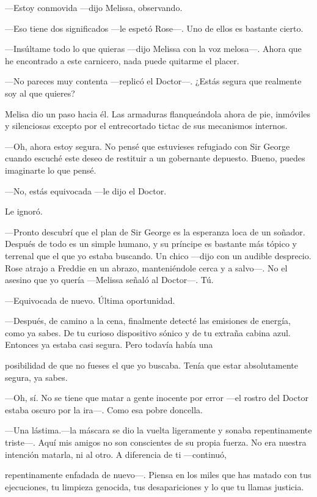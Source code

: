 {---Estoy conmovida ---dijo Melissa, observando.}

{---Eso tiene dos significados ---le espetó Rose---. Uno de ellos es
bastante cierto.}

{---Insúltame todo lo que quieras ---dijo Melissa con la voz melosa---.
	Ahora que he encontrado a este carnicero, nada puede quitarme el
placer.}

{---No pareces muy contenta ---replicó el Doctor---. ¿Estás segura que
realmente soy al que quieres?}

{Melisa dio un paso hacia él. Las armaduras flanqueándola ahora de pie,
	inmóviles y silenciosas excepto por el entrecortado tictac de sus
mecanismos internos.}

{---Oh, ahora estoy segura. No pensé que estuvieses refugiado con Sir
	George cuando escuché este deseo de restituir a un gobernante depuesto.
Bueno, puedes imaginarte lo que pensé.}

{---No, estás equivocada ---le dijo el Doctor.}

{Le ignoró.}

{---Pronto descubrí que el plan de Sir George es la esperanza loca de un
	soñador. Después de todo es un simple humano, y su príncipe es bastante
	más tópico y terrenal que el que yo estaba buscando. Un chico ---dijo
	con un audible desprecio. Rose atrajo a Freddie en un abrazo,
	manteniéndole cerca y a salvo---. No el asesino que yo quería ---Melissa
señaló al Doctor---. Tú.}

{---Equivocada de nuevo. Última oportunidad.}

{---Después, de camino a la cena, finalmente detecté las emisiones de
	energía, como ya sabes. De tu curioso dispositivo sónico y de tu extraña
cabina azul. Entonces ya estaba casi segura. Pero todavía había una}

{posibilidad de que no fueses el que yo buscaba. Tenía que estar
absolutamente segura, ya sabes.}

{---Oh, sí. No se tiene que matar a gente inocente por error ---el
rostro del Doctor estaba oscuro por la ira---. Como esa pobre doncella.}

{---Una lástima.---la máscara se dio la vuelta ligeramente y sonaba
	repentinamente triste---. Aquí mis amigos no son conscientes de su
	propia fuerza. No era nuestra intención matarla, ni al otro. A
diferencia de ti ---continuó,}

{repentinamente enfadada de nuevo---. Piensa en los miles que has matado
	con tus ejecuciones, tu limpieza genocida, tus desapariciones y lo que
tu llamas justicia.}

